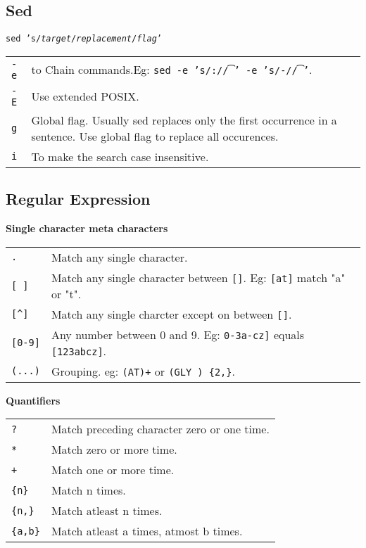 \subsection{Sed}

\texttt{sed 's/\textit{target}/\textit{replacement}/\textit{flag}'}

\begin{tabularx}{\linewidth}{lX}
\texttt{-e} & to Chain commands.Eg: \texttt{sed -e 's/:/\t/' -e 's/-/\t/'}.\\
\texttt{-E} & Use extended POSIX.\\
\texttt{g} & Global flag. Usually sed replaces only the first occurrence  in a sentence. Use global flag to replace all occurences.\\
\texttt{i} & To make the search case insensitive.\\
\end{tabularx}



\subsection{Regular Expression}

\textbf{Single character meta characters}
\begin{tabularx}{\linewidth}{lX}

\texttt{.} & Match any single character.\\
\texttt{[ ]} & Match any single character between \texttt{[]}. Eg: \texttt{[at]} match "a" or "t".\\
\texttt{[\^{}]} & Match any single charcter except on between \texttt{[]}.\\
\texttt{[0-9]} & Any number between 0 and 9. Eg: \texttt{0-3a-cz]} equals \texttt{[123abcz]}.\\
\texttt{(...)} & Grouping. eg: \texttt{(AT)+} or \texttt{(GLY ) \{2,\}}.\\
\hline

\end{tabularx}


\textbf{Quantifiers}
\begin{tabularx}{\linewidth}{lX}
\texttt{?} & Match preceding character zero or one time. \\
\texttt{*} & Match zero or more time.\\
\texttt{+} & Match one or more time.\\
\texttt{\{n\}} & Match n times.\\
\texttt{\{n,\}} & Match atleast n times.\\
\texttt{\{a,b\}} & Match atleast a times, atmost b times.\\

\hline

\end{tabularx}

